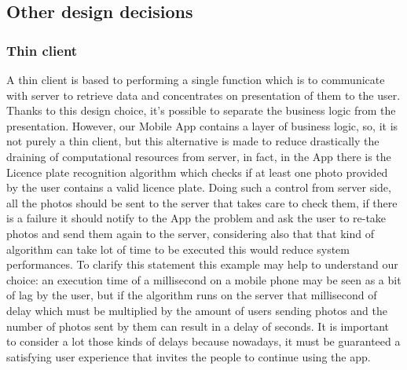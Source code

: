 \subsection{Other design decisions}
\subsubsection{Thin client }
A thin client is based to performing a single function which is to communicate with server to retrieve
data and concentrates on presentation of them to the user.
\newline
Thanks to this design choice, it’s possible to separate the business logic from the presentation. However, our Mobile App contains a layer of business logic, so, it is not purely a thin client, but this alternative is made to reduce drastically the draining of computational resources from server, in fact, in the App there is the Licence plate recognition algorithm which checks if at least one photo provided by the user contains a valid licence plate. Doing such a control from server side, all the photos should be sent to the server that takes care to check them, if there is a failure it should notify to the App the problem and ask the user to re-take photos and send them again to the server, considering also that that kind of algorithm can take lot of time to be executed this would reduce system performances. To clarify this statement this example may help to understand our choice: an execution time of a millisecond on a mobile phone may be seen as a bit of lag by the user, but if the algorithm runs on the server that millisecond of delay which must be multiplied by the amount of users sending photos and the number of photos sent by them can result in a delay of seconds. It is important to consider a lot those kinds of delays because nowadays, it must be guaranteed a satisfying user experience that invites the people to continue using the app.










